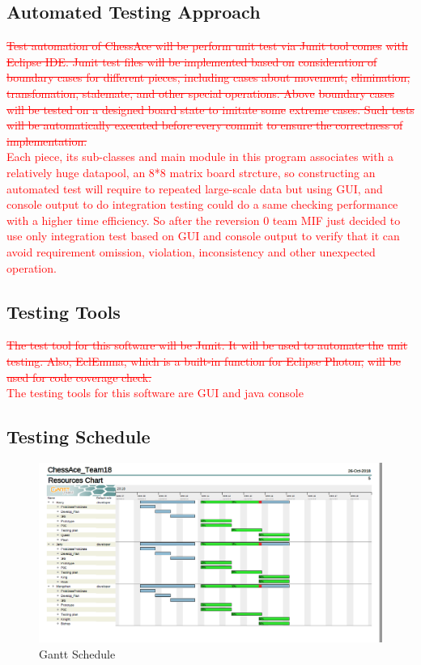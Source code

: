 \documentclass[12pt, titlepage]{article}
\begin{document}
\subsection{Automated Testing Approach}
\textcolor{red}{
\sout{Test automation of ChessAce will be perform unit test via Junit tool comes}
\sout{with Eclipse IDE. Junit test files will be implemented based on}
\sout{consideration of boundary cases for different pieces, including cases about movement,}
\sout{elimination, transfomation, stalemate, and other special operations. Above}
\sout{boundary cases will be tested on a designed board state to imitate some}
\sout{extreme cases. Such tests will be automatically executed before every commit}
\sout{to ensure the correctness of implementation.}}\\
\textcolor{red}{Each piece, its sub-classes and main module in this program associates with a relatively huge datapool, an 8*8 matrix board strcture, so constructing an automated test will require to repeated large-scale data but using GUI, and console output to do integration testing could do a same checking performance with a higher time efficiency.  So after the reversion 0 team MIF just decided to use only integration test based on GUI and console output to verify that it can avoid requirement omission, violation, inconsistency and other unexpected operation.}

\subsection{Testing Tools}
\textcolor{red}{
\sout{The test tool for this software will be Junit. It will be used to automate the} 
\sout{unit testing. Also, EclEmma, which is a built-in function for Eclipse Photon,} 
\sout{will be used for code coverage check.}}\\
\textcolor{red}{The testing tools for this software are GUI and java console}


\subsection{Testing Schedule}

\begin{figure}[H]
  \includegraphics[width=\linewidth]{schedule.png}
  \caption{Gantt Schedule}
  \label{fig:schl}
\end{figure}
\end{document}
